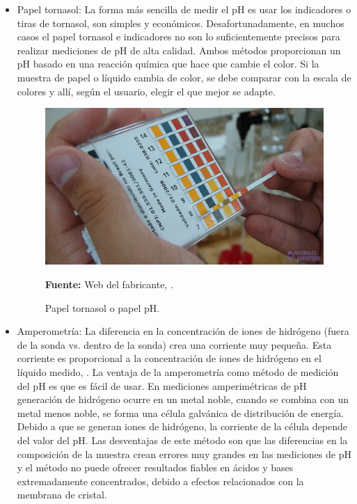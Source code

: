 \begin{itemize}
    \item Papel tornasol: La forma más sencilla de medir el pH es usar los indicadores o tiras de tornasol, son simples y econ\'omicos. Desafortunadamente, en muchos casos el papel tornasol e indicadores no son lo suficientemente precisos para realizar mediciones de pH de alta calidad. 
    Ambos m\'etodos proporcionan un pH basado en una reacci\'on química que hace que cambie el color. 
    Si la muestra de papel o l\'iquido cambia de color, se debe comparar con la escala de colores y all\'i, seg\'un el usuario, elegir el que mejor se adapte.
    
    \begin{figure}[ht]
        \centering
        \includegraphics[width=0.8\linewidth]{Imagenes/cap2/Papel-tornasol-min.png}\\
        \caption {Papel tornasol o papel pH. }
        \textbf{Fuente:} Web del fabricante, \cite{noauthor_papel-tornasol-min-768x432png_nodate}.
        \label{fig:tornasol}
    \end{figure}
    \item Amperometr\'ia: La diferencia en la concentraci\'on de iones de hidr\'ogeno (fuera de la sonda vs. dentro de la sonda) crea una corriente muy pequeña. 
    Esta corriente es proporcional a la concentraci\'on de iones de hidr\'ogeno en el l\'iquido medido, \cite{Atlas_pH}. 
    La ventaja de la amperometría como m\'etodo de medici\'on del pH es que es f\'acil de usar. 
    En mediciones amperim\'etricas de pH generaci\'on de hidr\'ogeno ocurre en un metal noble, cuando se combina con un metal menos noble, se forma una c\'elula galv\'anica de distribuci\'on de energ\'ia. 
    Debido a que se generan iones de hidr\'ogeno, la corriente de la c\'elula depende del valor del pH. 
    Las desventajas de este m\'etodo son que las diferencias en la composici\'on de la muestra crean errores muy grandes en las mediciones de pH y el m\'etodo no puede ofrecer resultados fiables en \'acidos y bases extremadamente concentrados, debido a efectos relacionados con la membrana de cristal. 

\end{itemize}
